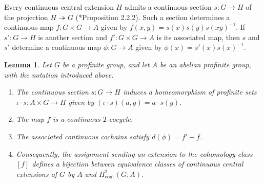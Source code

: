 \documentclass[11pt]{amsart}
\newtheorem{lemma}[theorem]{Lemma}
\theoremstyle{definition}
\numberwithin{equation}{section}
\numberwithin{equation}{section}
\DeclareMathOperator{\cont}{cont}
\begin{document}
Every continuous central extension $H$ admits a continuous section $s:G\rightarrow H$ of the projection $H\twoheadrightarrow G$ (\cite{Ribes-Zallesskii-profinite-groups}*{Proposition 2.2.2}). Such a section determines a continuous map $f:G\times G\rightarrow A$ given by $f(x,y)=s(x)s(y)s(xy)^{-1}$. If $s':G\rightarrow H$ is another section and $f':G\times G\rightarrow A$ is its associated map, then $s$ and $s'$ determine a continuous map $\phi:G\rightarrow A$ given by $\phi(x)=s'(x)s(x)^{-1}$.

\begin{lemma}\label{Lem: Correspondence between central extension and second cohomology}
Let $G$ be a profinite group, and let $A$ be an abelian profinite group, with the notation introduced above.
\begin{enumerate}[leftmargin=0.25in]
    \item The continuous section $s:G\rightarrow H$ induces a homeomorphism of profinite sets $\iota\cdot s: A\times G\rightarrow H$ given by $(\iota\cdot s)(a,g)=a\cdot s(g)$.
    \item The map $f$ is a continuous $2$-cocycle.
    \item The associated continuous cochains satisfy
    $d(\phi)=f'-f$.
    \item Consequently, the assignment sending an extension to the cohomology class $[f]$ defines a bijection between equivalence classes of continuous central extensions of $G$ by $A$ and $H^2_{\cont}(G;A)$.
\end{enumerate}
\end{lemma}
\end{document}

